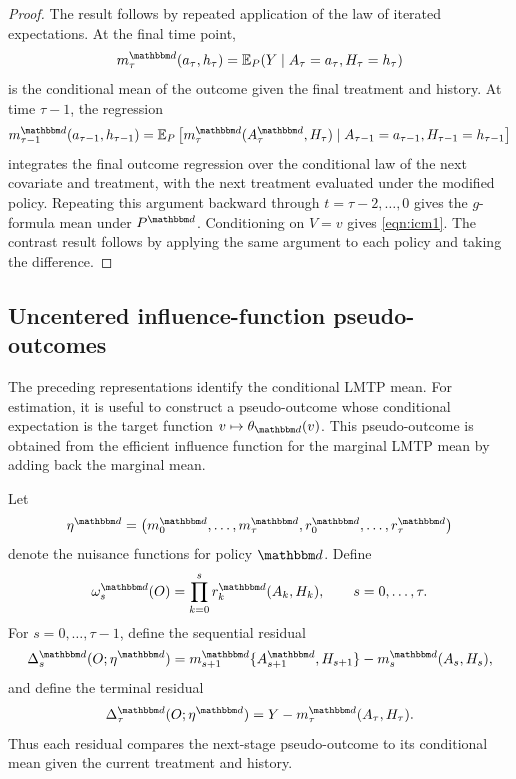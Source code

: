 \documentclass[11pt]{article}
\begin{document}
\begin{proof}
The result follows by repeated application of the law of iterated expectations. At the final
time point,
\[
 m_\tau^{\mathbbm d}(a_\tau,h_\tau)
  =
  \mathbb{E}_{P}(Y\mid A_\tau=a_\tau,H_\tau=h_\tau)
\]
is the conditional mean of the outcome given the final treatment and history.
At time \(\tau-1\), the regression
\[
  m_{\tau-1}^{\mathbbm d}(a_{\tau-1},h_{\tau-1})
  =
  \mathbb{E}_{P}
  \left[
    m_{\tau}^{\mathbbm d}(A_\tau^{\mathbbm d},H_\tau)
    \mid A_{\tau-1}=a_{\tau-1},H_{\tau-1}=h_{\tau-1}
  \right]
\]
integrates the final outcome regression over the conditional law of the next
covariate and treatment, with the next treatment evaluated under the modified
policy. Repeating this argument backward through
\(t=\tau-2,\ldots,0\) gives the \(g\)-formula mean under
\(P^{\mathbbm d}\). Conditioning on \(V=v\) gives \ref{eqn:icm1}. The contrast
result follows by applying the same argument to each policy and taking the
difference.
\end{proof}

\subsection{Uncentered influence-function pseudo-outcomes}
\label{subsec:uncentered-eif-pseudooutcomes}

The preceding representations identify the conditional LMTP mean. For
estimation, it is useful to construct a pseudo-outcome whose conditional
expectation is the target function \(v\mapsto \theta_{\mathbbm d}(v)\). This
pseudo-outcome is obtained from the efficient influence function for the marginal
LMTP mean by adding back the marginal mean.

Let
\[
  \eta^{\mathbbm d}
  =
  \left(
    m_0^{\mathbbm d},\ldots,m_\tau^{\mathbbm d},
    r_0^{\mathbbm d},\ldots,r_\tau^{\mathbbm d}
  \right)
\]
denote the nuisance functions for policy \(\mathbbm d\). Define
\[
  \omega_s^{\mathbbm d}(O)
  =
  \prod_{k=0}^{s}
  r_k^{\mathbbm d}(A_k,H_k),
  \qquad
  s=0,\ldots,\tau.
\]
For \(s=0,\ldots,\tau-1\), define the sequential residual
\[
  \Delta_s^{\mathbbm d}(O;\eta^{\mathbbm d})
  =
  m_{s+1}^{\mathbbm d}
  \{A_{s+1}^{\mathbbm d},H_{s+1}\}
  -
  m_s^{\mathbbm d}(A_s,H_s),
\]
and define the terminal residual
\[
  \Delta_\tau^{\mathbbm d}(O;\eta^{\mathbbm d})
  =
  Y - m_\tau^{\mathbbm d}(A_\tau,H_\tau).
\]
Thus each residual compares the next-stage pseudo-outcome to its conditional
mean given the current treatment and history.
\end{document}
